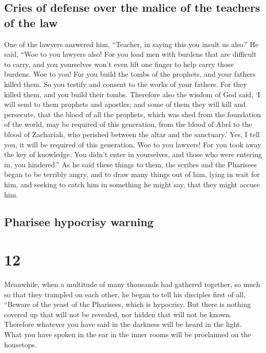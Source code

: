 \hypertarget{cries-of-defense-over-the-malice-of-the-teachers-of-the-law}{%
\subsection{Cries of defense over the malice of the teachers of the
law}\label{cries-of-defense-over-the-malice-of-the-teachers-of-the-law}}

 One of the lawyers answered him, ``Teacher, in saying
this you insult us also.''  He said, ``Woe to you lawyers
also! For you load men with burdens that are difficult to carry, and you
yourselves won't even lift one finger to help carry those burdens.
 Woe to you! For you build the tombs of the prophets, and
your fathers killed them.  So you testify and consent to
the works of your fathers. For they killed them, and you build their
tombs.  Therefore also the wisdom of God said, `I will
send to them prophets and apostles; and some of them they will kill and
persecute,  that the blood of all the prophets, which was
shed from the foundation of the world, may be required of this
generation,  from the blood of Abel to the blood of
Zachariah, who perished between the altar and the sanctuary.' Yes, I
tell you, it will be required of this generation.  Woe to
you lawyers! For you took away the key of knowledge. You didn't enter in
yourselves, and those who were entering in, you hindered.''
 As he said these things to them, the scribes and the
Pharisees began to be terribly angry, and to draw many things out of
him,  lying in wait for him, and seeking to catch him in
something he might say, that they might accuse him.

\hypertarget{pharisee-hypocrisy-warning}{%
\subsection{Pharisee hypocrisy
warning}\label{pharisee-hypocrisy-warning}}

\hypertarget{section-11}{%
\section{12}\label{section-11}}

 Meanwhile, when a multitude of many thousands had
gathered together, so much so that they trampled on each other, he began
to tell his disciples first of all, ``Beware of the yeast of the
Pharisees, which is hypocrisy.  But there is nothing
covered up that will not be revealed, nor hidden that will not be known.
 Therefore whatever you have said in the darkness will be
heard in the light. What you have spoken in the ear in the inner rooms
will be proclaimed on the housetops.

